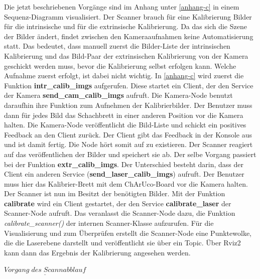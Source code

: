 		Die jetzt beschriebenen Vorgänge sind im Anhang unter \ref{anhang-c} in einem Sequenz-Diagramm visualisiert. \newline
		Der Scanner brauch für eine Kalibrierung Bilder für die intrinsische und für die extrinsische Kalibrierung. Da das sich die Szene der Bilder ändert, findet zwischen den Kameraaufnahmen keine Automatisierung statt. Das bedeutet, dass manuell zuerst die Bilder-Liste der intrinsischen Kalibrierung und das Bild-Paar der extrinsischen Kalibrierung von der Kamera geschickt werden muss, bevor die Kalibrierung selbst erfolgen kann. Welche Aufnahme zuerst erfolgt, ist dabei nicht wichtig. In \ref{anhang-c} wird zuerst die Funktion \textbf{intr\_calib\_imgs} aufgerufen. Diese startet ein Client, der den Service der Kamera \textbf{send\_cam\_calib\_imgs} aufruft. Die Kamera-Node benutzt daraufhin ihre Funktion zum Aufnehmen der Kalibrierbilder. Der Benutzer muss dann für jedes Bild das Schachbrett in einer anderen Position vor die Kamera halten. Die Kamera-Node veröffentlicht die Bild-Liste und schickt ein positives Feedback an den Client zurück. Der Client gibt das Feedback in der Konsole aus und ist damit fertig. Die Node hört somit auf zu existieren. Der Scanner reagiert auf das veröffentlichen der Bilder und speichert sie ab. \newline
		Der selbe Vorgang passiert bei der Funktion \textbf{extr\_calib\_imgs}. Der Unterschied besteht darin, dass der Client ein anderen Service (\textbf{send\_laser\_calib\_imgs}) aufruft. Der Benutzer muss hier das Kalibrier-Brett mit dem ChArUco-Board vor die Kamera halten. \newline
		Der Scanner ist nun im Besitzt der benötigten Bilder. Mit der Funktion \textbf{calibrate} wird ein Client gestartet, der den Service \textbf{calibrate\_laser} der Scanner-Node aufruft. Das veranlasst die Scanner-Node dazu, die Funktion \textit{calibrate\_scanner()} der internen Scanner-Klasse aufzurufen. Für die Visualisierung und zum Überprüfen erstellt die Scanner-Node eine Punktewolke, die die Laserebene darstellt und veröffentlicht sie über ein Topic. Über Rviz2 kann dann das Ergebnis der Kalibrierung angesehen werden.
		
		$\underline{Vorgang\;des\;Scannabblauf}$
		
